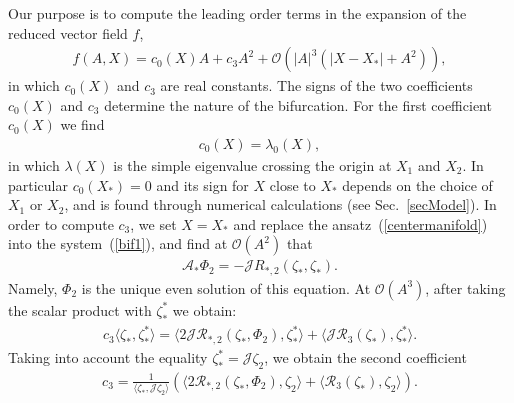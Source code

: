 Our purpose is to compute the leading order terms in the expansion of the reduced vector field $f$,
\begin{align}
f(A,X) = c_0 (X) A + c_3 A^2 + \mathcal{O} (|A|^3 (|X-X_*| + A^2) ),
\nonumber
\end{align}
in which $c_0(X)$ and $c_3$ are real constants.  The signs of the two coefficients $c_0 (X)$ and $c_3$ determine the nature of the bifurcation.  For the first coefficient $c_0(X)$ we find
\begin{align}
c_0(X) = \lambda_0 (X),
\nonumber
\end{align}
in which $\lambda(X)$ is the simple eigenvalue crossing the origin at $X_1$ and $X_2$.  In particular $c_0(X_*) = 0 $ and its sign for $X$ close to $X_*$ depends on the choice of $X_1$ or $X_2$, and is found through numerical calculations (see Sec.~\ref{secModel}).  In order to compute $c_3$, we set $X=X_*$ and replace the ansatz~(\ref{centermanifold}) into the system~(\ref{bif1}), and find at $\mathcal{O}(A^2)$ that
%
\begin{align}
\mathcal{A}_{*} \Phi_2 = - \mathcal{J} R_{*,2}(\zeta_*, \zeta_*).
\end{align}
%
Namely, $\Phi_2$ is the unique even solution of this equation.  At $\mathcal{O}(A^3)$, after taking the scalar product with $\zeta_*^*$ we obtain:
\begin{align}
c_3 \langle \zeta_*, \zeta_*^* \rangle = \langle 2\mathcal{J} \mathcal{R}_{*, 2}(\zeta_*, \Phi_2), \zeta_*^* \rangle + \langle \mathcal{J} \mathcal{R}_3 (\zeta_*), \zeta_*^* \rangle.
\nonumber
\end{align}
%
Taking into account the equality $\zeta_*^* = \mathcal{J} \zeta_2$, we obtain the second coefficient
\begin{align}
c_3 = \frac{1}{\langle \zeta_*, \mathcal{J} \zeta_2 \rangle} \left( \langle 2 \mathcal{R}_{*,2}(\zeta_*, \Phi_2), \zeta_2 \rangle + \langle \mathcal{R}_3(\zeta_*), \zeta_2 \rangle \right).
\nonumber
\end{align}

